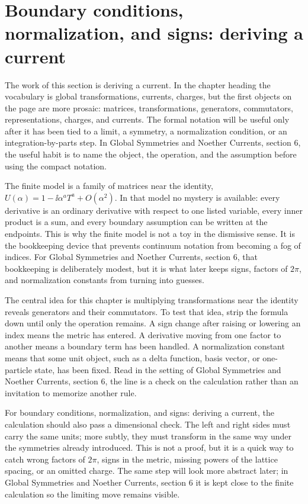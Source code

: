 \section{Boundary conditions, normalization, and signs: deriving a current}

The work of this section is deriving a current.  In the chapter heading the vocabulary is global transformations, currents, charges, but the first objects on the page are more prosaic: matrices, transformations, generators, commutators, representations, charges, and currents.  The formal notation will be useful only after it has been tied to a limit, a symmetry, a normalization condition, or an integration-by-parts step.  In Global Symmetries and Noether Currents, section 6, the useful habit is to name the object, the operation, and the assumption before using the compact notation.

The finite model is a family of matrices near the identity, \(U(\alpha)=1-\ii\alpha^aT^a+O(\alpha^2)\).  In that model no mystery is available: every derivative is an ordinary derivative with respect to one listed variable, every inner product is a sum, and every boundary assumption can be written at the endpoints.  This is why the finite model is not a toy in the dismissive sense.  It is the bookkeeping device that prevents continuum notation from becoming a fog of indices.  For Global Symmetries and Noether Currents, section 6, that bookkeeping is deliberately modest, but it is what later keeps signs, factors of \(2\pi\), and normalization constants from turning into guesses.

The central idea for this chapter is multiplying transformations near the identity reveals generators and their commutators.  To test that idea, strip the formula down until only the operation remains.  A sign change after raising or lowering an index means the metric has entered.  A derivative moving from one factor to another means a boundary term has been handled.  A normalization constant means that some unit object, such as a delta function, basis vector, or one-particle state, has been fixed.  Read in the setting of Global Symmetries and Noether Currents, section 6, the line is a check on the calculation rather than an invitation to memorize another rule.

For boundary conditions, normalization, and signs: deriving a current, the calculation should also pass a dimensional check.  The left and right sides must carry the same units; more subtly, they must transform in the same way under the symmetries already introduced.  This is not a proof, but it is a quick way to catch wrong factors of \(2\pi\), signs in the metric, missing powers of the lattice spacing, or an omitted charge.  The same step will look more abstract later; in Global Symmetries and Noether Currents, section 6 it is kept close to the finite calculation so the limiting move remains visible.

